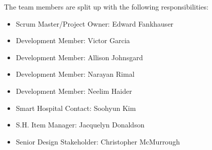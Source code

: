 \begin{flushleft}
The team members are split up with the following responsibilities:
\end{flushleft}
\begin{itemize}
	\item Scrum Master/Project Owner: Edward Fankhauser
	\item Development Member: Victor Garcia
	\item Development Member: Allison Johnsgard
	\item Development Member: Narayan Rimal
	\item Development Member: Neelim Haider
	\item Smart Hospital Contact: Soohyun Kim
	\item S.H. Item Manager: Jacquelyn Donaldson
	\item Senior Design Stakeholder: Christopher McMurrough
\end{itemize}
